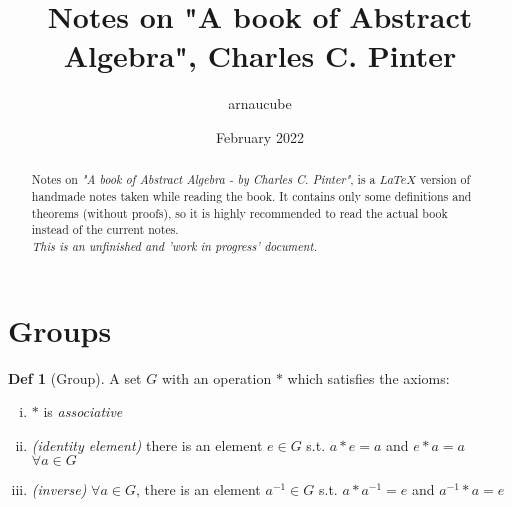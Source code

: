 \documentclass{article}
\title{Notes on "A book of Abstract Algebra", Charles C. Pinter}
\author{arnaucube}
\date{February 2022}
\theoremstyle{definition}
\newtheorem{definition}{Def}[section]
\begin{document}
\maketitle

\begin{abstract}
    Notes on \emph{"A book of Abstract Algebra - by Charles C. Pinter"}, is a $LaTeX$ version of handmade notes taken while reading the book. It contains only some definitions and theorems (without proofs), so it is highly recommended to read the actual book instead of the current notes.
    \\
    \emph{This is an unfinished and 'work in progress' document.}
\end{abstract}

\tableofcontents

% 

\section{Groups}

\begin{definition}[Group]
    A set $G$ with an operation $*$ which satisfies the axioms:
    \begin{enumerate}[i.]
	\item $*$ is \emph{associative}
	\item \emph{(identity element)} there is an element $e \in G$ s.t. $a * e = a$ and $e * a = a$ $\forall a \in G$
	\item \emph{(inverse)} $\forall a \in G$, there is an element $a^{-1} \in G$ s.t. $a*a^{-1} = e$ and $a^{-1} * a =e$
    \end{enumerate}
\end{definition}
\end{document}
